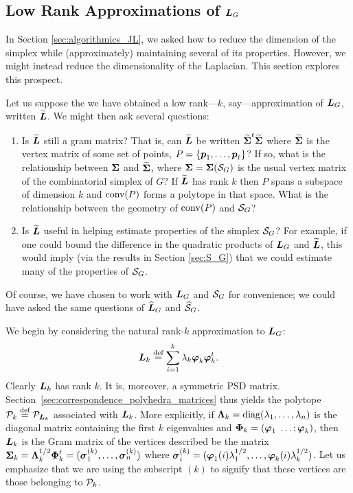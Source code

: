 



\subsection{Low Rank Approximations of \texorpdfstring{$\L_G$}{the Laplacian}}
\label{sec:algorithmics_low_rank}
In Section  \ref{sec:algorithmics_JL}, we asked how to reduce the  dimension of the  simplex  while (approximately) maintaining several of its  properties. However,  we might instead  reduce the dimensionality of the  Laplacian. This section explores this prospect. 


Let us suppose the we have obtained a low rank---$k$, say---approximation of $\L_G$, written $\tL$. We might then ask several questions: 
\begin{enumerate}
	\item Is $\tL$ still a gram matrix? That is, can $\tL$ be written $\tSv^\tp\tSv$ where $\tSv$ is the vertex matrix of some set of points, $P=\{\p_1,\dots,\p_\ell\}$? If so, what is the relationship between $\Sv$ and $\tSv$, where $\Sv=\Sv(\splx_G)$ is the usual vertex matrix of the combinatorial simplex of $G$? If $\tL$ has rank $k$ then $P$ spans a subspace of dimension $k$ and $\conv(P)$ forms a polytope in that space. What is the relationship between the geometry of $\conv(P)$ and $\splx_G$?
	\item Is $\tL$ useful in helping estimate properties of the simplex $\splx_G$? For example, if one could bound the difference in the quadratic products of $\L_G$ and $\tL$, this would imply (via the results in Section \ref{sec:S_G}) that we could estimate many of the properties of $\splx_G$. 
	\end{enumerate}

Of course, we have chosen to work with $\L_G$ and $\splx_G$ for convenience; we could have asked the same questions of $\Ln_G$ and $\splxn_G$. 

We begin by considering the natural rank-$k$ approximation to $\L_G$: 
\begin{equation*}
\L_k\equiv \sum_{i=1}^k \lambda_k\vp_k\vp_k^\tp.
\end{equation*}
Clearly $\L_k$ has rank $k$.  It is, moreover, a symmetric PSD matrix.  Section~\ref{sec:correspondence_polyhedra_matrices} thus yields the polytope $\P_k\equiv \P_{\L_k}$ associated  with $\L_k$. More  explicitly, if 
 $\Eval_k=\diag(\lambda_1,\dots,\lambda_n)$ is the diagonal  matrix containing the first $k$  eigenvalues and $\Eig_k = (\vp_1\;\dots;\vp_k)$, then $\L_k$ is the Gram matrix of the vertices described be the matrix $\Sv_k = \Eval_k^{1/2}\Eig_k^\tp=(\sv_1^\k,\dots,\sv_n^\k)$ where $\sv_i^\k=(\vp_1(i)\lambda_1^{1/2},\dots,\vp_k(i)\lambda_k^{1/2})$. Let us emphasize that we  are using  the subscript $(k)$ to signify that these vertices are  those belonging to  $\P_k$. 
 
